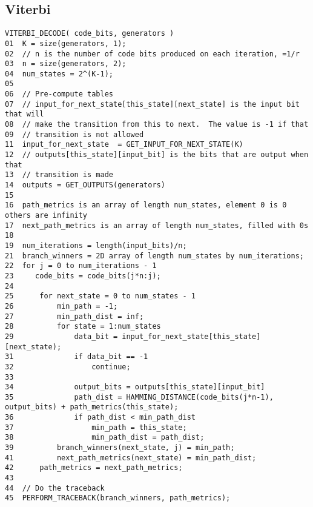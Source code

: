 \documentclass[11pt]{article}
\begin{document}
        \subsection{Viterbi}
        \begin{verbatim}
VITERBI_DECODE( code_bits, generators )
01  K = size(generators, 1);
02  // n is the number of code bits produced on each iteration, =1/r
03  n = size(generators, 2);
04  num_states = 2^(K-1);
05  
06  // Pre-compute tables
07  // input_for_next_state[this_state][next_state] is the input bit that will
08  // make the transition from this to next.  The value is -1 if that
09  // transition is not allowed
11  input_for_next_state  = GET_INPUT_FOR_NEXT_STATE(K)
12  // outputs[this_state][input_bit] is the bits that are output when that
13  // transition is made
14  outputs = GET_OUTPUTS(generators)
15  
16  path_metrics is an array of length num_states, element 0 is 0 others are infinity
17  next_path_metrics is an array of length num_states, filled with 0s
18  
19  num_iterations = length(input_bits)/n;
21  branch_winners = 2D array of length num_states by num_iterations;
22  for j = 0 to num_iterations - 1
23     code_bits = code_bits(j*n:j);
24     
25      for next_state = 0 to num_states - 1
26          min_path = -1;
27          min_path_dist = inf;
28          for state = 1:num_states
29              data_bit = input_for_next_state[this_state][next_state);
31              if data_bit == -1 
32                  continue;
33
34              output_bits = outputs[this_state][input_bit]
35              path_dist = HAMMING_DISTANCE(code_bits(j*n-1), output_bits) + path_metrics(this_state);
36              if path_dist < min_path_dist
37                  min_path = this_state;
38                  min_path_dist = path_dist;
39          branch_winners(next_state, j) = min_path;
41          next_path_metrics(next_state) = min_path_dist;  
42      path_metrics = next_path_metrics;
43  
44  // Do the traceback
45  PERFORM_TRACEBACK(branch_winners, path_metrics);
    \end{verbatim}
        
\end{document}
